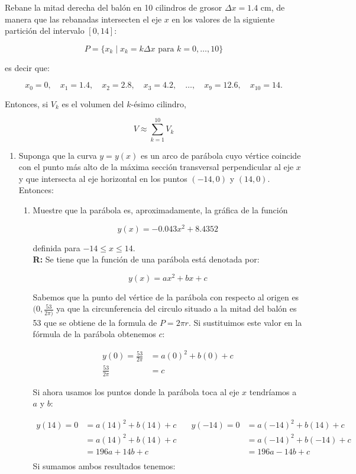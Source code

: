 \documentclass[12pt]{article}
\begin{document}
Rebane la mitad derecha del balón en 10 cilindros de grosor \( \Delta x = 1.4 \) cm, de manera que las rebanadas intersecten el eje \( x \) en los valores de la siguiente partición del intervalo \([0, 14]\):

\[
P = \{x_k \mid x_k = k \Delta x \text{ para } k = 0, \ldots, 10\}
\]

es decir que:

\[
x_0 = 0, \quad x_1 = 1.4, \quad x_2 = 2.8, \quad x_3 = 4.2, \quad \ldots, \quad x_9 = 12.6, \quad x_{10} = 14.
\]

Entonces, si \( V_k \) es el volumen del \( k \)-ésimo cilindro,

\[
V \approx \sum_{k=1}^{10} V_k
\]
\renewcommand{\theenumi}{\alph{enumi}}
\begin{enumerate}
\item Suponga que la curva \( y = y(x) \) es un arco de parábola cuyo vértice coincide con el punto más alto de la máxima sección transversal perpendicular al eje \( x \) y que intersecta al eje horizontal en los puntos \((-14, 0)\) y \((14, 0)\). Entonces:
\renewcommand{\theenumi}{\arabic{enumi}}
\begin{enumerate}
    \item Muestre que la parábola es, aproximadamente, la gráfica de la función

\[
y(x) = -0.043 x^2 + 8.4352
\]

definida para \(-14 \leq x \leq 14\).\\
{\bf R:} Se tiene que la función de una parábola está denotada por:

\[ y(x)=ax^2+bx+c\]

Sabemos que la punto del vértice de la parábola con respecto al origen es $(0, \frac{53}{2\pi)}$ ya que la circunferencia del circulo situado a la mitad del  balón es 53 que se obtiene de la formula de  $P = 2\pi r$. Si sustituimos este valor en la fórmula de la parábola obtenemos $c$:

        \begin{align*}
            y(0)= \frac{53}{2\pi} &= a(0)^2+b(0)+c\\
            \frac{53}{2\pi} &= c
        \end{align*}
  
        Si ahora usamos los puntos donde la parábola toca al eje $x$ tendríamos a $a$ y $b$:
        
       \begin{align*}
            y(14)=0&= a(14)^2+b(14)+c &\quad y(-14)=0&= a(-14)^2+b(14)+c\\
             &= a(14)^2+b(14)+c &\quad &= a(-14)^2+b(-14)+c\\
            &= 196a+14b+c &\quad &= 196a-14b+c\\ 
        \end{align*}
            Si sumamos ambos resultados tenemos:\\
            

\end{enumerate}
\end{enumerate}
\end{document}
